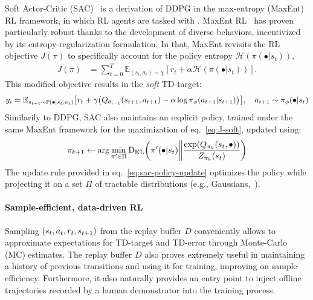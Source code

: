 Soft Actor-Critic (SAC)~\citep{haarnojaSoftActorCriticOffPolicy2018} is a derivation of DDPG in the max-entropy (MaxEnt) RL framework, in which RL agents are tasked with .
MaxEnt RL~\citep{haarnojaReinforcementLearningDeep2017b} has proven particularly robust thanks to the development of diverse behaviors, incentivized by its entropy-regularization formulation.
In that, MaxEnt revisits the RL objective \( J (\pi) \) to specifically account for the policy entropy \( \mathcal H(\pi (\bullet \vert s_t)) \),
\begin{align}
    J(\pi) &= \sum_{t=0}^T \mathbb{E}_{(s_t, a_t) \sim \chi} \left[ r_t + \alpha \mathcal H(\pi (\bullet \vert s_t)) \right].
    \label{eq:J-soft}
\end{align}
This modified objective results in the \emph{soft} TD-target:
\begin{equation}\label{eq:soft-td-target}
    y_i = \mathbb E_{s_{t+1} \sim \mathbb P( \bullet \vert s_t, a_t)} \left[ r_t + \gamma \left( Q_{\theta_{i-1}} (\stateplusone, a_{t+1}) - \alpha \log \pi_\phi(a_{t+1} \vert \stateplusone) \right) \right], \quad a_{t+1} \sim \pi_\phi(\bullet \vert s_t)
\end{equation}
Similarily to DDPG, SAC also maintains an explicit policy, trained under the same MaxEnt framework for the maximization of eq.~\ref{eq:J-soft}, updated using:
\begin{equation}\label{eq:sac-policy-update}
    \pi_{k+1} \leftarrow \arg\min_{\pi^\prime \in \Pi} \DKL \left(\pi^\prime (\bullet \vert \state) \bigg\Vert \frac{\exp(Q_{\pi_k}(s_t, \bullet))}{Z_{\pi_k}(s_t)} \right)
\end{equation}
The update rule provided in eq.~\ref{eq:sac-policy-update} optimizes the policy while projecting it on a set \( \Pi \) of tractable distributions (e.g., Gaussians,~\citet{haarnojaReinforcementLearningDeep2017b}).

\paragraph{Sample-efficient, data-driven RL}
Sampling \( (s_t, a_t, r_t, s_{t+1}) \) from the replay buffer \( D \) conveniently allows to approximate expectations for TD-target and TD-error through Monte-Carlo (MC) estimates.
The replay buffer \( D \) also proves extremely useful in maintaining a history of previous transitions and using it for training, improving on sample efficiency.
Furthermore, it also naturally provides an entry point to inject offline trajectories recorded by a human demonstrator into the training process.

